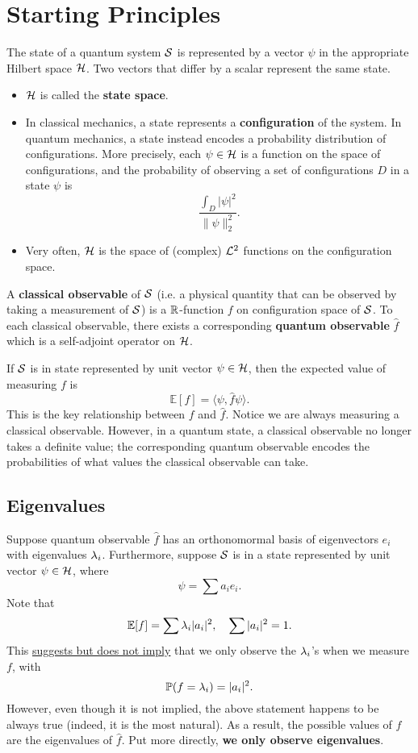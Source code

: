 \section{Starting Principles}

The state of a quantum system ${\mathcal S}$ is represented by a vector $\psi$ in the appropriate Hilbert space ${\mathcal H}$. Two vectors that differ by a scalar represent the same state.
\begin{itemize}
    \item ${\mathcal H}$ is called the \textbf{state space}.
    \item In classical mechanics, a state represents a \textbf{configuration} of the system. In quantum mechanics, a state instead encodes a probability distribution of configurations. More precisely, each $\psi \in {\mathcal H}$ is a function on the space of configurations, and the probability of observing a set of configurations $D$ in a state $\psi$ is
    \[
        \frac{\int_D |\psi|^2}{\|\psi\|_2^2}.
    \]
    \item Very often, ${\mathcal H}$ is the space of (complex) ${\mathcal L}^2$ functions on the configuration space.
\end{itemize}

A \textbf{classical observable} of ${\mathcal S}$ (i.e. a physical quantity that can be observed by taking a measurement of ${\mathcal S}$) is a ${\mathbb R}$-function $f$ on configuration space of ${\mathcal S}$. To each classical observable, there exists a corresponding \textbf{quantum observable} $\hat{f}$ which is a self-adjoint operator on ${\mathcal H}$.

If ${\mathcal S}$ is in state represented by unit vector $\psi \in {\mathcal H}$, then the expected value of measuring $f$ is
\[
    \mathbb E[f] = \langle \psi, \hat{f} \psi \rangle.
\]
This is the key relationship between $f$ and $\hat{f}$. Notice we are always measuring a classical observable. However, in a quantum state, a classical observable no longer takes a definite value; the corresponding quantum observable encodes the probabilities of what values the classical observable can take.

\subsection{Eigenvalues}

Suppose quantum observable $\hat{f}$ has an orthonomormal basis of eigenvectors $e_i$ with eigenvalues $\lambda_i$. Furthermore, suppose ${\mathcal S}$ is in a state represented by unit vector $\psi \in {\mathcal H}$, where
\[
    \psi = \sum a_i e_i.
\]
Note that
\[
    \mathbb E[f] = \sum \lambda_i |a_i|^2, \quad \sum |a_i|^2 = 1.
\]
This \underline{suggests but does not imply} that we only observe the $\lambda_i$'s when we measure $f$, with
\[
    \mathbb P(f = \lambda_i) = |a_i|^2.
\]
However, even though it is not implied, the above statement happens to be always true (indeed, it is the most natural). As a result, the possible values of $f$ are the eigenvalues of $\hat{f}$. Put more directly, \textbf{we only observe eigenvalues}.

